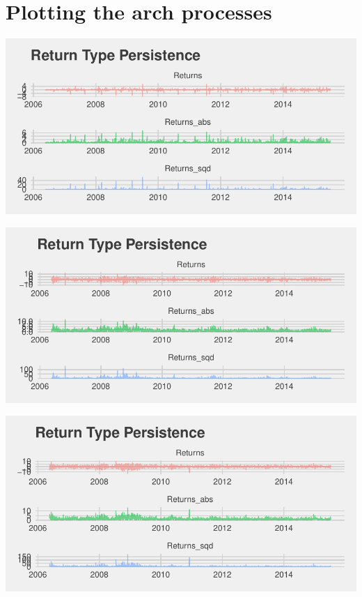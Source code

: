 \documentclass[11pt,preprint, authoryear]{elsarticle}
\let\origfigure\figure
\let\endorigfigure\endfigure
\renewenvironment{figure}[1][2] {
    \expandafter\origfigure\expandafter[H]
} {
    \endorigfigure
}
\numberwithin{equation}{section}
\numberwithin{figure}{section}
\numberwithin{table}{section}
\begin{document}
\endgroup

\section{Plotting the arch processes}\label{plotting-the-arch-processes}

\begin{figure}[H]

{\centering \includegraphics{Template_files/figure-latex/figure2-1} 

}

\caption{ABSP \label{absp}}\label{fig:figure2}
\end{figure}\begin{figure}[H]

{\centering \includegraphics{Template_files/figure-latex/figure3-1} 

}

\caption{BVT \label{bvt}}\label{fig:figure3}
\end{figure}\begin{figure}[H]

{\centering \includegraphics{Template_files/figure-latex/figure4-1} 

}
\end{figure}
\end{document}
